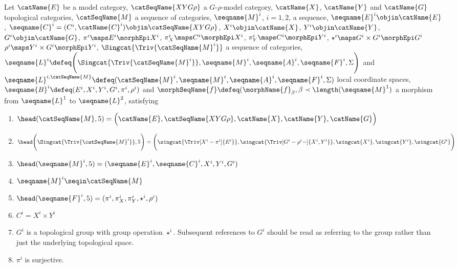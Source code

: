 \documentclass{article}
\begin{document}
\begin{definition}
\label{def:LCStoBun}
Let $\catName{E}$ be a model category,
$\catSeqName{XYG\rho}$ a $G$-$\rho$-model category,
$\catName{X}$, $\catName{Y}$ and $\catName{G}$ topological categories,
$\catSeqName{M}$ a sequence of categories,
$\seqname{M}^i$, $i=1,2$, a sequence,
$\seqname{E}^i \objin \catName{E}$,
$\seqname{C}^i = (C^i,\catName{C}^i) \objin \catSeqName{XYG\rho}$,
$X^i \objin \catName{X}$,
$Y^i \objin \catName{Y}$,
$G^i \objin \catName{G}$,
$\pi^i \maps E^i \morphEpi X^i$,
$\pi^i_X \maps C^i \morphEpi X^i$,
$\pi^i_Y \maps C^i \morphEpi Y^i$,
\nobreaks
  {{
    $
      \star^i \maps G^i \times G^i \morphEpi G^i
    $
  }}
$\rho^i \maps Y^i \times G^i \morphEpi Y^i$,
$\Singcat{\Triv{\catSeqName{M}^i}}$ a sequence of categories,
$
  \seqname{L}^i \defeq
  \Biggl (
    \Singcat{\Triv{\catSeqName{M}^i}},
    \seqname{M}^i,
    \seqname{A}^i,
    \seqname{F}^i,
    \Sigma
  \Biggr )
$
and
$
  \seqname{L}^{i,\catSeqName{M}} \defeq
  (
    \catSeqName{M}^i,
    \seqname{M}^i,
    \seqname{A}^i,
    \seqname{F}^i,
    \Sigma
  )
$
local coordinate spaces,
$\seqname{B}^i \defeq (E^i, X^i, Y^i, G^i, \pi^i, \rho^i)$
and
$\morphSeqName{f} \defeq (\morphName{f}_\beta, \beta \prec \length(\seqname{M}^1)$
a morphism from $\seqname{L}^1$ to $\seqname{L}^2$,
satisfying
\begin{enumerate}
\item
$
  \head(\catSeqName{M},5) =
  \Bigl  (
    \catName{E},
    \catSeqName{XYG\rho},
    \catName{X},
    \catName{Y},
    \catName{G}
  \Bigr  )
$
\item
$
  \head \Biggl ( \Singcat{\Triv{\catSeqName{M}^i}},5 \Biggr )  =
  \Biggl  (
    \singcat{\Triv[X^i-\pi^i]{E^i}},
    \singcat{\Triv[G^i-\rho^i-]{X^i,Y^i}},
    \singcat{X^i},
    \singcat{Y^i},
    \singcat{G^i}
  \Biggr  )
$
\item
$
  \head(\seqname{M}^i,5) =
  (
    \seqname{E}^i,
    \seqname{C}^i,
    X^i,
    Y^i,
    G^i
  )
$
\item $\seqname{M}^i \seqin \catSeqName{M}$
\item
$
  \head(\seqname{F}^i,5) =
  (
    \pi^i,
    \pi^i_X,
    \pi^i_Y,
    \star^i,
    \rho^i
  )
$
\item $C^i = X^i \times Y^i$
\item $G^i$ is a topological group with group operation $\star^i$.
Subsequent references to $G^i$ should be read as referring to
the group rather than just the underlying topological space.
\item $\pi^i$ is surjective.

\end{enumerate}
\end{definition}
\end{document}
